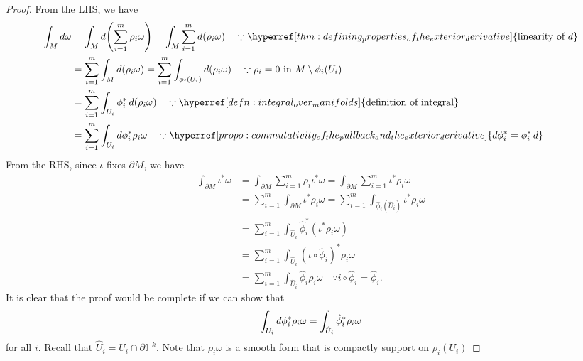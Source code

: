 \documentclass[notoc,notitlepage]{tufte-book}
\begin{document}
\begin{proof}
  From the LHS, we have
  \begin{align*}
    \int_{M} \dif{\omega}
    &= \int_{M} \dif{\left( \sum_{i=1}^{m} \rho_i \omega \right)}
     = \int_{M} \sum_{i=1}^{m} \dif{(\rho_i \omega)}
     \quad \because
     \hyperref[thm:defining_properties_of_the_exterior_derivative]{\text{linearity
     of } d} \\
    &= \sum_{i=1}^{m} \int_{M} \dif{(\rho_i \omega)}
     = \sum_{i=1}^{m} \int_{\phi_i(U_i)} \dif{(\rho_i \omega)}
     \quad \because \rho_i = 0 \text{ in } M \setminus \phi_i(U_i) \\
    &= \sum_{i=1}^{m} \int_{U_i} \phi_i^* \dif{(\rho_i \omega)}
     \quad \because \hyperref[defn:integral_over_manifolds]{\text{definition of
     integral}} \\
    &= \sum_{i=1}^{m} \int_{U_i} \dif{\phi_i^* \rho_i \omega}
     \quad \because
     \hyperref[propo:commutativity_of_the_pullback_and_the_exterior_derivative]{\dif{\phi_i^*}
     = \phi_i^*\dif{}}
  \end{align*}
  From the RHS, since $\iota$ fixes $\partial M$, we have
  \begin{align*}
    \int_{\partial M} \iota^* \omega
    &= \int_{\partial M} \sum_{i=1}^{m} \rho_i \iota^* \omega
     = \int_{\partial M} \sum_{i=1}^{m} \iota^* \rho_i \omega \\
    &= \sum_{i=1}^{m} \int_{\partial M} \iota^* \rho_i \omega
     = \sum_{i=1}^{m} \int_{\hat{\phi}_i(\hat{U}_i)} \iota^* \rho_i \omega \\
    &= \sum_{i=1}^{m} \int_{\hat{U}_i} \hat{\phi}_i^* (\iota^* \rho_i \omega) \\
    &= \sum_{i=1}^{m} \int_{\hat{U}_i} (\iota \circ \hat{\phi}_i)^* \rho_i
     \omega \\
    &= \sum_{i=1}^{m} \int_{\hat{U}_i} \hat{\phi}_i \rho_i \omega
     \quad \because i \circ \hat{\phi}_i = \hat{\phi}_i.
  \end{align*}
  It is clear that the proof would be complete if we can show that
  \begin{equation*}
    \int_{U_i} \mathop{}\!d{\phi_i^* \rho_i \omega} = \int_{\hat{U}_i} \hat{\phi}_i^*
    \rho_i \omega
  \end{equation*}
  for all $i$. Recall that $\hat{U}_i = U_i \cap \partial \mathbb{H}^k$. Note
  that $\rho_i \omega$ is a smooth form that is compactly support on
  $\rho_i(U_i)$ 
\end{proof}
\end{document}
